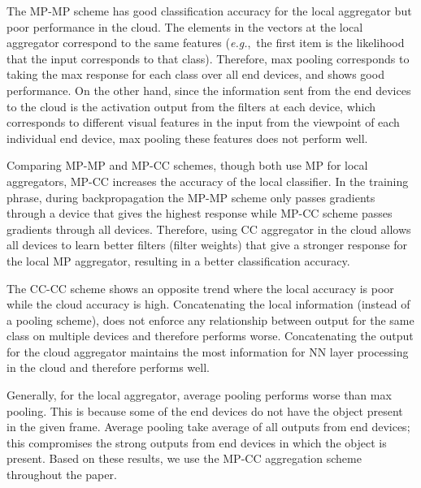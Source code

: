 \documentclass[10pt, conference, compsocconf]{IEEEtran}
\newcommand{\eg}{\emph{e.g.}}
\begin{document}
The MP-MP scheme has good classification accuracy for the local aggregator but poor performance in the cloud. The elements in the vectors at the local aggregator correspond to the same features (\eg,~the first item is the likelihood that the input corresponds to that class). Therefore, max pooling corresponds to taking the max response for each class over all end devices, and shows good performance. On the other hand, since the information sent from the end devices to the cloud is the activation output from the filters at each device, which corresponds to different visual features in the input from the viewpoint of each individual end device, max pooling these features does not perform well. 

Comparing MP-MP and MP-CC schemes, though both use MP for local aggregators, MP-CC increases the accuracy of the local classifier. In the training phrase, during backpropagation the MP-MP scheme only passes gradients through a device that gives the highest response while MP-CC scheme passes gradients through all devices. Therefore, using CC aggregator in the cloud allows all devices to learn better filters (filter weights) that give a stronger response for the local MP aggregator, resulting in a better classification accuracy.

The CC-CC scheme shows an opposite trend where the local accuracy is poor while the cloud accuracy is high. Concatenating the local information (instead of a pooling scheme), does not enforce any relationship between output for the same class on multiple devices and therefore performs worse. Concatenating the output for the cloud aggregator maintains the most information for NN layer processing in the cloud and therefore performs well. 

Generally, for the local aggregator, average pooling performs worse than max pooling. This is because some of the end devices do not have the object present in the given frame. Average pooling take average of all outputs from end devices; this compromises the strong outputs from end devices in which the object is present. Based on these results, we use the MP-CC aggregation scheme throughout the paper.

\end{document}
